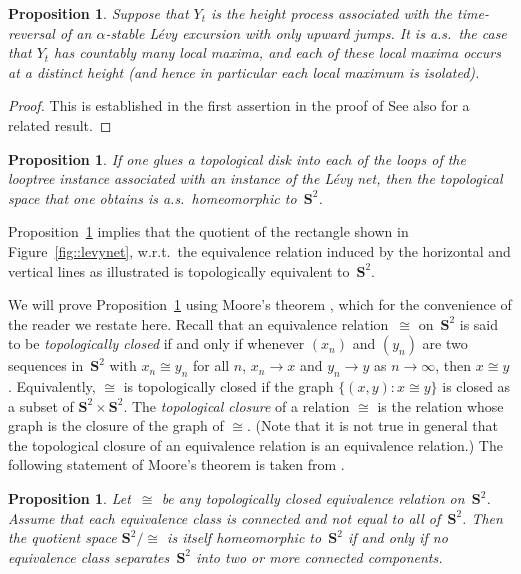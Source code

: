 \documentclass[JEP,XML,SOM,Unicode]{cedram}
\theoremstyle{plain}
\numberwithin{theorem}{section}
\newtheorem{proposition}[theorem]{Proposition}
\theoremstyle{definition}
\renewcommand{\S}{{\mathbf S}}
\begin{document}
\begin{proposition}
\label{prop::noisolatedmax}
Suppose that $Y_t$ is the height process associated with the time-reversal of an $\alpha$-stable Lévy excursion with only upward jumps. It is a.s.\ the case that $Y_t$ has countably many local maxima, and each of these local maxima occurs at a distinct height (and hence in particular each local maximum is isolated).
\end{proposition}
\begin{proof}
This is established in the first assertion in the proof of \cite[Th.\,4.4]{duquesnelegall2005levytrees}
See also \cite[Lem.\,2.5.3]{dlg2002trees_levy} for a related result.
\end{proof}

\begin{proposition}
\label{prop::spherelevynet}
If one glues a topological disk into each of the loops of the looptree instance associated with an instance of the Lévy net, then the topological space that one obtains is a.s.\ homeomorphic to~$\S^2$.
\end{proposition}

Proposition~\ref{prop::spherelevynet} implies that the quotient of the rectangle shown in Figure~\ref{fig::levynet}, w.r.t.\ the equivalence relation induced by the horizontal and vertical lines as illustrated is topologically equivalent to~$\S^2$.

We will prove Proposition~\ref{prop::spherelevynet} using Moore's theorem \cite{moore1925concerning}, which for the convenience of the reader we restate here. Recall that an equivalence relation~$\cong$ on~$\S^2$ is said to be \emph{topologically closed} if and only if whenever $(x_n)$ and $(y_n)$ are two sequences in~$\S^2$ with $x_n \cong y_n$ for all $n$, $x_n \to x$ and $y_n \to y$ as $n \to \infty$, then $x \cong y$. Equivalently, $\cong$ is topologically closed if the graph $\{(x,y): x \cong y \}$ is closed as a subset of $\S^2 \times \S^2$. The \emph{topological closure} of a relation $\cong$ is the relation whose graph is the closure of the graph of $\cong$. (Note that it is not true in general that the topological closure of an equivalence relation is an equivalence relation.) The following statement of Moore's theorem is taken from \cite{milnor2004pasting}.

\begin{proposition}
\label{prop::moore}
Let~$\cong$ be any topologically closed equivalence relation on~$\S^2$. Assume that each equivalence class is connected and not equal to all of~$\S^2$. Then the quotient space $\S^2 / \cong$ is itself homeomorphic to~$\S^2$ if and only if no equivalence class separates~$\S^2$ into two or more connected components.
\end{proposition}
\end{document}
